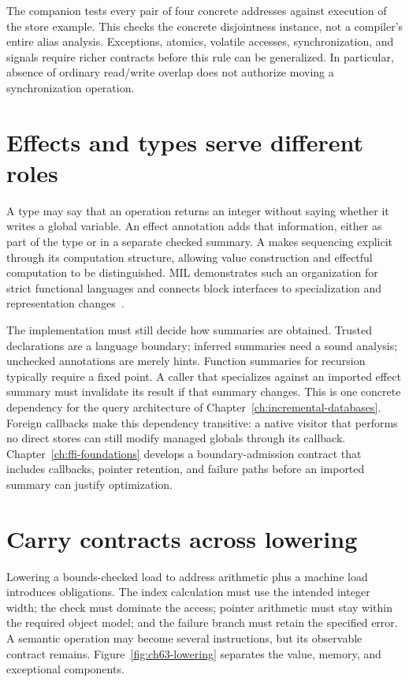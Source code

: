 The companion tests every pair of four concrete addresses against execution of the store example.
This checks the concrete disjointness instance, not a compiler's entire alias analysis.
Exceptions, atomics, volatile accesses, synchronization, and signals require richer contracts before this rule can be generalized.
In particular, absence of ordinary read/write overlap does not authorize moving a synchronization operation.

\section{Effects and types serve different roles}
\label{sec:ch63-types}

A type may say that an operation returns an integer without saying whether it writes a global variable.
An effect annotation adds that information, either as part of the type or in a separate checked summary.
A  makes sequencing explicit through its computation structure, allowing value construction and effectful computation to be distinguished.
MIL demonstrates such an organization for strict functional languages and connects block interfaces to specialization and representation changes~\cite{jones-2018-mil}.

The implementation must still decide how summaries are obtained.
Trusted declarations are a language boundary; inferred summaries need a sound analysis; unchecked annotations are merely hints.
Function summaries for recursion typically require a fixed point.
A caller that specializes against an imported effect summary must invalidate its result if that summary changes.
This is one concrete dependency for the query architecture of Chapter~\ref{ch:incremental-databases}.
Foreign callbacks make this dependency transitive: a native visitor that performs no direct stores can still modify managed globals through its callback.
Chapter~\ref{ch:ffi-foundations} develops a boundary-admission contract that includes callbacks, pointer retention, and failure paths before an imported summary can justify optimization.

\section{Carry contracts across lowering}
\label{sec:ch63-lowering}

Lowering a bounds-checked load to address arithmetic plus a machine load introduces obligations.
The index calculation must use the intended integer width; the check must dominate the access; pointer arithmetic must stay within the required object model; and the failure branch must retain the specified error.
A semantic operation may become several instructions, but its observable contract remains.
Figure~\ref{fig:ch63-lowering} separates the value, memory, and exceptional components.

